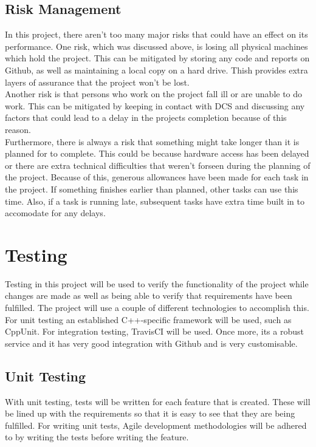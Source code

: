 \documentclass{report}
\begin{document}
\section*{Risk Management}

In this project, there aren't too many major risks that could have an effect on its performance. One risk, which was discussed 
above, is losing all physical machines which hold the project. This can be mitigated by storing any code and reports on Github, 
as well as maintaining a local copy on a hard drive. Thish provides extra layers of assurance that the project won't be lost. 
\bigskip\\
Another risk is that persons who work on the project fall ill or are unable to do work. This can be mitigated by keeping in 
contact with DCS and discussing any factors that could lead to a delay in the projects completion because of this reason.
\bigskip\\
Furthermore, there is always a risk that something might take longer than it is planned for to complete. This could be because hardware 
access has been delayed or there are extra technical difficulties that weren't forseen during the planning of the project. Because of this, 
generous allowances have been made for each task in the project. If something finishes earlier than planned, other tasks can use this time. 
Also, if a task is running late, subsequent tasks have extra time built in to accomodate for any delays.

\chapter*{Testing}

Testing in this project will be used to verify the functionality of the project while changes are made as 
well as being able to verify that requirements have been fulfilled. The project will use a couple of different 
technologies to accomplish this. For unit testing an established C++-specific framework will be used, such 
as CppUnit.
For integration testing, TravisCI will be used. Once more, its a robust service and it has very good integration with Github and 
is very customisable. 

\section*{Unit Testing}

With unit testing, tests will be written for each feature that is created. These will be lined up with the requirements so that 
it is easy to see that they are being fulfilled. For writing unit tests, Agile development methodologies will be adhered to by 
writing the tests before writing the feature. 
\end{document}
